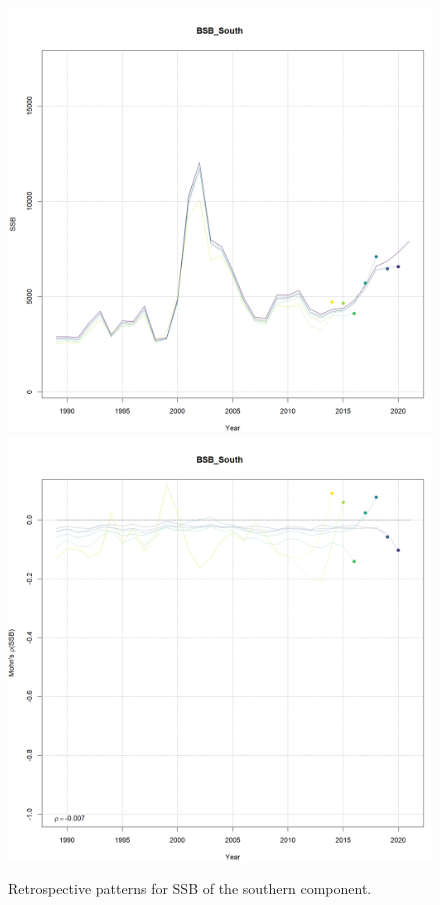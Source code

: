 \documentclass[
]{article}
\begin{document}
\begin{figure}

{\centering \includegraphics[width=0.65\linewidth]{../2023.RT.Runs/Run34/plots_png/retro/BSB_South_SSB_retro} \includegraphics[width=0.65\linewidth]{../2023.RT.Runs/Run34/plots_png/retro/BSB_South_SSB_retro_relative} 

}

\caption{Retrospective patterns for SSB of the southern component.}\label{fig:South-retro-ssb}
\end{figure}
\end{document}

